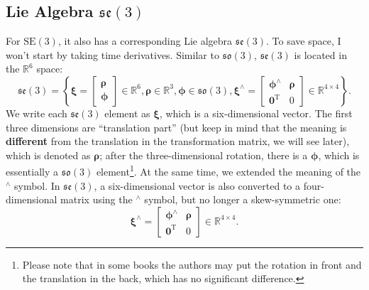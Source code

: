 \subsection{Lie Algebra $\mathfrak{se}(3)$}
For $\mathrm{SE}(3)$, it also has a corresponding Lie algebra $\mathfrak{se}(3)$. To save space, I won't start by taking time derivatives. Similar to $\mathfrak{so}(3)$, $\mathfrak{se}(3)$ is located in the $\mathbb{R}^6$ space:
\begin{equation}
\mathfrak{se}(3) = \left\{ { \boldsymbol{\xi} = \left[ \begin{array}{l}
    \boldsymbol{\rho} \\
    \boldsymbol{\phi}
    \end{array} \right]
    \in { \mathbb{R}^6} ,
    \boldsymbol{\rho} \in { \mathbb{R}^3}, \boldsymbol{\phi} \in \mathfrak{so} \left( 3 \right),{ \boldsymbol{\xi} ^ \wedge } = \left[ {\begin{array}{*{20}{c}}
        {{ \boldsymbol{\phi} ^ \wedge }}& \boldsymbol{\rho} \\
        {{\mathbf{0}^\mathrm{T}}}&0
        \end{array}} \right] \in { \mathbb{R}^{4 \times 4}}} \right\}.
\end{equation}
We write each $\mathfrak{se}(3)$ element as $\boldsymbol{\xi}$, which is a six-dimensional vector. The first three dimensions are ``translation part'' (but keep in mind that the meaning is \textbf{different} from the translation in the transformation matrix, we will see later), which is denoted as $\boldsymbol{\rho}$; after the three-dimensional rotation, there is a $\boldsymbol{\phi}$, which is essentially a $\mathfrak{so}(3)$ element\footnote{Please note that in some books the authors may put the rotation in front and the translation in the back, which has no significant difference.}. At the same time, we extended the meaning of the $^\wedge$ symbol. In $\mathfrak{se}(3)$, a six-dimensional vector is also converted to a four-dimensional matrix using the $^\wedge$ symbol, but no longer a skew-symmetric one:
\begin{equation}
{ \boldsymbol{\xi} ^ \wedge } = \left[ {\begin{array}{*{20}{c}}
    {{ \boldsymbol{\phi} ^ \wedge }}& \boldsymbol{\rho} \\
    {{\mathbf{0}^\mathrm{T}}}&0
    \end{array}} \right] \in { \mathbb{R}^{4 \times 4}}.
\end{equation}

